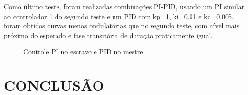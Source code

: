 \documentclass[a4paper,12pt]{article}
\begin{document}
Como último teste, foram realizadas combinações PI-PID, usando um PI similar ao controlador 1 do segundo teste e um PID com kp=1, ki=0,01 e kd=0,005, foram obtidos curvas menos ondulatórias que no segundo teste, com nível mais próximo do esperado e fase transitória de duração praticamente igual.
\begin{figure}[H]
     \centering
\hspace{1cm}
     
     \caption{Controle PI no escravo e PID no mestre}
     \label{fig:ControlePI}
\end{figure}


\newpage


\thispagestyle{main}

\section{CONCLUSÃO}
\end{document}
